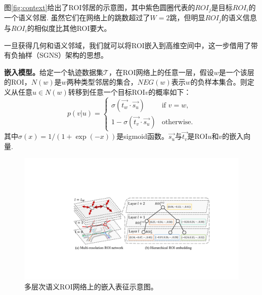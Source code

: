 图\ref{fig:context}给出了ROI邻居的示意图，其中紫色圆圈代表的${ROI}_j$是目标${ROI}_i$的一个语义邻居. 虽然它们在网络上的跳数超过了$W=2$跳，但明显${ROI}_j$的语义信息与${ROI}_i$的相似度比其他ROI要大。

一旦获得几何和语义邻域，我们就可以将ROI嵌入到高维空间中，这一步借用了带有负抽样（SGNS）架构的思想。

\vspace{3mm}
\textbf{嵌入模型。}给定一个轨迹数据集$\mathcal{T}$，在ROI网络上的任意一层，假设$w$是一个该层的ROI，$N(w)$是$w$两种类型邻居的集合，$NEG(w)$表示$w$的负样本集合。则定义从任意$u\in{N(w)}$转移到任意一个目标ROI$v$的概率如下：
\begin{equation}
\label{eq:transP}
p(v|u) =
\begin{cases}
\sigma(\vec{t_w}\cdot{}\vec{s_u}) & \text{if } v = w,\\
1- \sigma(\vec{t_v}\cdot{}\vec{s_u}) & \text{otherwise}.
\end{cases}
\end{equation}
其中$\sigma(x)=1/(1+\exp{(-x)})$是sigmoid函数。$\vec{s_u}$与$\vec{t_v}$是ROI$u$和$v$的嵌入向量.


\begin{figure}[!t]
\centering
\includegraphics[width=130mm]{pics/Hembedding.pdf}
\caption {多层次语义ROI网络上的嵌入表征示意图。}
\label{fig:Hembedding}
\end{figure}


